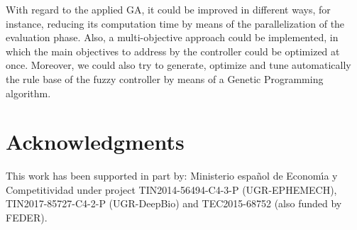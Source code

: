 \documentclass[conference]{IEEEtran}
\begin{document}
With regard to the applied GA, it could be improved in different ways,
for instance, reducing its computation time by means of the
parallelization of the evaluation phase. Also, a multi-objective
approach could be implemented, in which the main objectives to address
by the controller could be optimized at once. 
Moreover, we could also try to generate, optimize and tune
automatically the rule base of the fuzzy controller by means of a
Genetic Programming algorithm.  

\section*{Acknowledgments}

This work has been supported in part by: Ministerio espa\~{n}ol de
Econom\'{\i}a y Competitividad under project TIN2014-56494-C4-3-P
(UGR-EPHEMECH), TIN2017-85727-C4-2-P (UGR-DeepBio) and TEC2015-68752 (also funded by FEDER).



\end{document}
